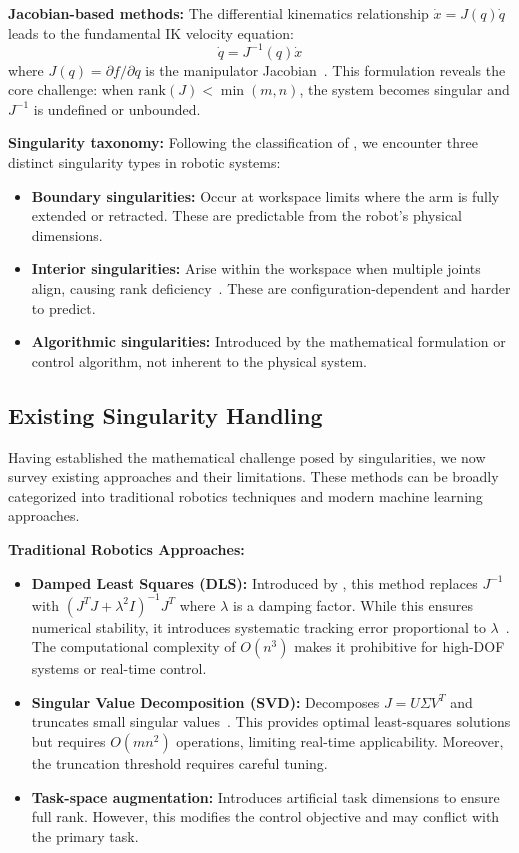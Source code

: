 \documentclass[twoside,11pt]{article}
\begin{document}
\textbf{Jacobian-based methods:} The differential kinematics relationship $\dot{x} = J(q)\dot{q}$ leads to the fundamental IK velocity equation:
$$\dot{q} = J^{-1}(q)\dot{x}$$
where $J(q) = \partial f/\partial q$ is the manipulator Jacobian~\citep{nakamura1991advanced}. This formulation reveals the core challenge: when $\mathrm{rank}(J) < \min(m,n)$, the system becomes singular and $J^{-1}$ is undefined or unbounded.

\textbf{Singularity taxonomy:} Following the classification of \citet{chiacchio1990review}, we encounter three distinct singularity types in robotic systems:
\begin{itemize}
\item \textbf{Boundary singularities:} Occur at workspace limits where the arm is fully extended or retracted. These are predictable from the robot's physical dimensions.
\item \textbf{Interior singularities:} Arise within the workspace when multiple joints align, causing rank deficiency~\citep{yoshikawa1985manipulability}. These are configuration-dependent and harder to predict.
\item \textbf{Algorithmic singularities:} Introduced by the mathematical formulation or control algorithm, not inherent to the physical system.
\end{itemize}
\subsection{Existing Singularity Handling}
Having established the mathematical challenge posed by singularities, we now survey existing approaches and their limitations. These methods can be broadly categorized into traditional robotics techniques and modern machine learning approaches.

\textbf{Traditional Robotics Approaches:}
\begin{itemize}
\item \textbf{Damped Least Squares (DLS):} Introduced by \citet{wampler1986manipulator}, this method replaces $J^{-1}$ with $(J^TJ + \lambda^2I)^{-1}J^T$ where $\lambda$ is a damping factor. While this ensures numerical stability, it introduces systematic tracking error proportional to $\lambda$~\citep{dls1977damped}. The computational complexity of $O(n^3)$ makes it prohibitive for high-DOF systems or real-time control.
\item \textbf{Singular Value Decomposition (SVD):} Decomposes $J = U\Sigma V^T$ and truncates small singular values~\citep{golub2013matrix}. This provides optimal least-squares solutions but requires $O(mn^2)$ operations, limiting real-time applicability. Moreover, the truncation threshold requires careful tuning.
\item \textbf{Task-space augmentation:} Introduces artificial task dimensions to ensure full rank. However, this modifies the control objective and may conflict with the primary task.
\end{itemize}
\end{document}
